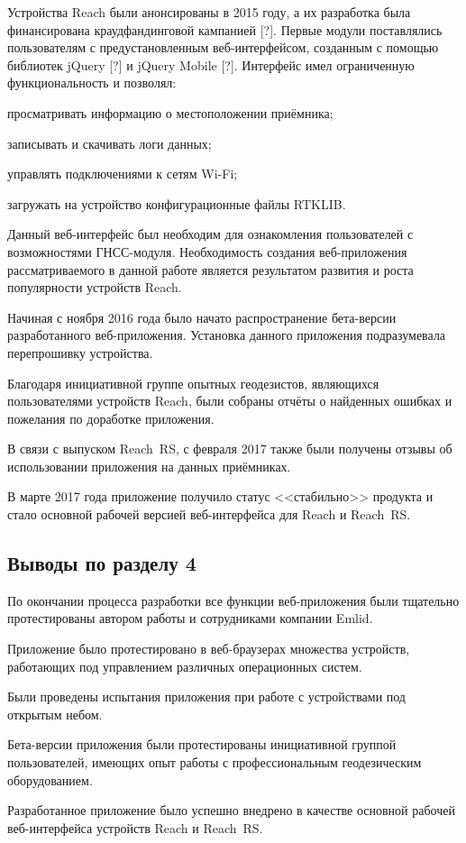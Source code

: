Устройства Reach были анонсированы в 2015 году, а их разработка была финансирована краудфандинговой кампанией [?]. Первые модули поставлялись пользователям с предустановленным веб-интерфейсом, созданным с помощью библиотек jQuery [?] и jQuery Mobile [?]. Интерфейс имел ограниченную функциональность и позволял:
\begin{dashitemize}
  \item просматривать информацию о местоположении приёмника;
  \item записывать и скачивать логи данных;
  \item управлять подключениями к сетям Wi-Fi;
  \item загружать на устройство конфигурационные файлы RTKLIB.
\end{dashitemize}

Данный веб-интерфейс был необходим для ознакомления пользователей с возможностями ГНСС-модуля. Необходимость создания веб-приложения рассматриваемого в данной работе является результатом развития и роста популярности устройств Reach.

Начиная с ноября 2016 года было начато распространение бета-версии разработанного веб-приложения. Установка данного приложения подразумевала перепрошивку устройства.

Благодаря инициативной группе опытных геодезистов, являющихся пользователями устройств Reach, были собраны отчёты о найденных ошибках и пожелания по доработке приложения.

В связи с выпуском Reach~RS, с февраля 2017 также были получены отзывы об использовании приложения на данных приёмниках.

В марте 2017 года приложение получило статус <<стабильно>> продукта и стало основной рабочей версией веб-интерфейса для Reach и Reach~RS.



\subsection{Выводы по разделу 4}

\begin{dashitemize}
  \item По окончании процесса разработки все функции веб-приложения были тщательно протестированы автором работы и сотрудниками компании Emlid.
  \item Приложение было протестировано в веб-браузерах множества устройств, работающих под управлением различных операционных систем.
  \item Были проведены испытания приложения при работе с устройствами под открытым небом.
  \item Бета-версии приложения были протестированы инициативной группой пользователей, имеющих опыт работы с профессиональным геодезическим оборудованием.
  \item Разработанное приложение было успешно внедрено в качестве основной рабочей веб-интерфейса устройств Reach и Reach~RS.
\end{dashitemize}

\newpage